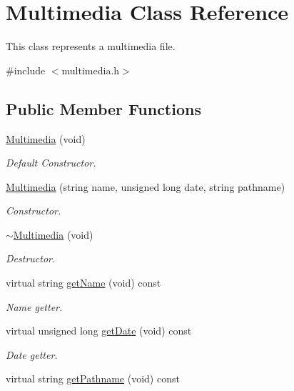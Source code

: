 \hypertarget{class_multimedia}{\section{Multimedia Class Reference}
\label{class_multimedia}
}


This class represents a multimedia file.  




{\ttfamily \#include $<$multimedia.\-h$>$}

\subsection*{Public Member Functions}
\begin{DoxyCompactItemize}
\item 
\hyperlink{class_multimedia_af613763f6779c2e75fce0749b9a8a734}{Multimedia} (void)
\begin{DoxyCompactList}\small\item\em Default Constructor. \end{DoxyCompactList}\item 
\hyperlink{class_multimedia_a4b955c8674fb9ff39e57fd178f08bada}{Multimedia} (string name, unsigned long date, string pathname)
\begin{DoxyCompactList}\small\item\em Constructor. \end{DoxyCompactList}\item 
\hyperlink{class_multimedia_a53798cec796a3aa8df3a35dfaa37bfe7}{$\sim$\-Multimedia} (void)
\begin{DoxyCompactList}\small\item\em Destructor. \end{DoxyCompactList}\item 
virtual string \hyperlink{class_multimedia_a8cc74dd745e553a881e6d5b210a542f6}{get\-Name} (void) const 
\begin{DoxyCompactList}\small\item\em Name getter. \end{DoxyCompactList}\item 
virtual unsigned long \hyperlink{class_multimedia_a8c5b6295faee6c9690a513dd0f4b4a79}{get\-Date} (void) const 
\begin{DoxyCompactList}\small\item\em Date getter. \end{DoxyCompactList}\item 
virtual string \hyperlink{class_multimedia_a6cff0cb9e8a32d2589c77ebf37250da3}{get\-Pathname} (void) const 

\end{DoxyCompactItemize}
